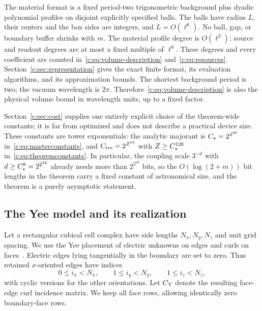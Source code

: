 The material format is a fixed period-two trigonometric background plus
dyadic polynomial profiles on disjoint explicitly specified balls. The
balls have radius $L$, their centers and the box sides are integers, and
$L=O(\ell^6)$. No ball, gap, or boundary buffer shrinks with $m$.
The material profile degree is $O(\ell^2)$; source and readout degrees
are at most a fixed multiple of $\ell^8$. These degrees and every
coefficient are counted in~\eqref{c:eq:volume-description}
and~\eqref{c:eq:resources}. Section~\ref{c:sec:representation}
gives the exact finite format, its evaluation algorithms, and its
approximation bounds. The shortest background period is two; the vacuum
wavelength is $2\pi$. Therefore~\eqref{c:eq:volume-description} is also the physical
volume bound in wavelength units, up to a fixed factor.

Section~\ref{c:sec:cost} supplies one entirely explicit choice of the
theorem-wide constants; it is far from optimized and does not describe a
practical device size. These constants are tower exponentials: the
analytic majorant is $C_\star=2^{2^{40}}$ in~\eqref{c:eq:masterconstants},
and $C_{\rm res}=2^{Z^{16}}$ with $Z\ge C_\star^{128}$ in~\eqref{c:eq:theoremconstants}.
In particular, the coupling scale $3^{-d}$ with $d\ge C_\star^8=2^{2^{43}}$
already needs more than $2^{2^{43}}$ bits, so the $O(\log(2+m))$ bit
lengths in the theorem carry a fixed constant of astronomical size, and
the theorem is a purely asymptotic statement.

\subsection{The Yee model and its realization}\label{d:sec:model}

Let a rectangular cubical cell complex have side lengths $N_x,N_y,N_z$ and unit grid spacing. We use the Yee placement of electric unknowns on edges and curls on faces~\citep{yee1966}. Electric edges lying tangentially in the boundary are set to zero. Thus retained $x$-oriented edges have indices
\begin{equation}\label{d:eq:pec-index}
 0\le i_x<N_x,\qquad 1\le i_y<N_y,\qquad 1\le i_z<N_z,
\end{equation}
with cyclic versions for the other orientations. Let $C_{\rm Y}$ denote the resulting face-edge curl incidence matrix. We keep all face rows, allowing identically zero boundary-face rows.


